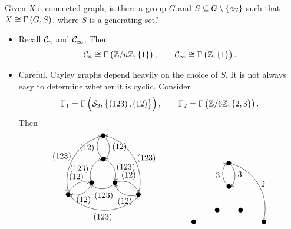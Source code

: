 \begin{exercise}
Given $ X $ a connected graph, is there a group $ G $ and $ S \subseteq G \setminus \cbr{e_G} $ such that $ X \cong \Gamma\br{G, S} $, where $ S $ is a generating set?
\end{exercise}

\begin{example}
\hfill
\begin{itemize}
\item Recall $ \CCC_n $ and $ \CCC_\infty $. Then
$$ \CCC_n \cong \Gamma\br{\ZZ / n\ZZ, \cbr{1}}, \qquad \CCC_\infty \cong \Gamma\br{\ZZ, \cbr{1}}. $$
\item Careful. Cayley graphs depend heavily on the choice of $ S $. It is not always easy to determine whether it is cyclic. Consider
$$ \Gamma_1 = \Gamma\br{\SSS_3, \cbr{\br{123}, \br{12}}}, \qquad \Gamma_2 = \Gamma\br{\ZZ / 6\ZZ, \cbr{2, 3}}. $$
Then
$$
\begin{array}{ccc}
\begin{tikzpicture}
\fill (0, 0) circle (0.1);
\fill (0, -1) circle (0.1);
\fill (-0.5, -2) circle (0.1);
\fill (0.5, -2) circle (0.1);
\fill (-1.5, -2.5) circle (0.1);
\fill (1.5, -2.5) circle (0.1);
\draw [->] (0, 0) to [bend left=45] node[right]{$ \br{12} $} (0.1, -1);
\draw [->] (0, 0) to [bend right=45] node[left]{$ \br{123} $} (-1.5, -2.4);
\draw [->] (0, -1) to [bend left=45] node[left]{$ \br{12} $} (-0.1, 0);
\draw [->] (0, -1) to [bend left=45] node[right]{$ \br{123} $} (0.5, -1.9);
\draw [->] (-0.5, -2) to [bend left=45] node[left]{$ \br{123} $} (-0.1, -1);
\draw [->] (-0.5, -2) to [bend left=45] node[below]{$ \br{12} $} (-1.4, -2.5);
\draw [->] (0.5, -2) to [bend left=45] node[below]{$ \br{123} $} (-0.5, -2.1);
\draw [->] (0.5, -2) to [bend left=45] node[above]{$ \br{12} $} (1.5, -2.4);
\draw [->] (-1.5, -2.5) to [bend left=45] node[above]{$ \br{12} $} (-0.6, -2);
\draw [->] (-1.5, -2.5) to [bend right=45] node[below]{$ \br{123} $} (1.5, -2.6);
\draw [->] (1.5, -2.5) to [bend right=45] node[right]{$ \br{123} $} (0.1, 0);
\draw [->] (1.5, -2.5) to [bend left=45] node[below]{$ \br{12} $} (0.5, -2.1);
\end{tikzpicture}
& \qquad &
\begin{tikzpicture}
\fill (0, 0) circle (0.1);
\fill (0, -1) circle (0.1);
\fill (-0.5, -2) circle (0.1);
\fill (0.5, -2) circle (0.1);
\fill (-1.5, -2.5) circle (0.1);
\fill (1.5, -2.5) circle (0.1);
\draw [->] (0, 0) to [bend left=45] node[right]{$ 3 $} (0.1, -1);
\draw [->] (0, 0) to [bend left=45] node[right]{$ 2 $} (1.5, -2.4);
\draw [->] (0, -1) to [bend left=45] node[left]{$ 3 $} (-0.1, 0);

\end{tikzpicture}
\end{array}$$
\end{itemize}
\end{example}
